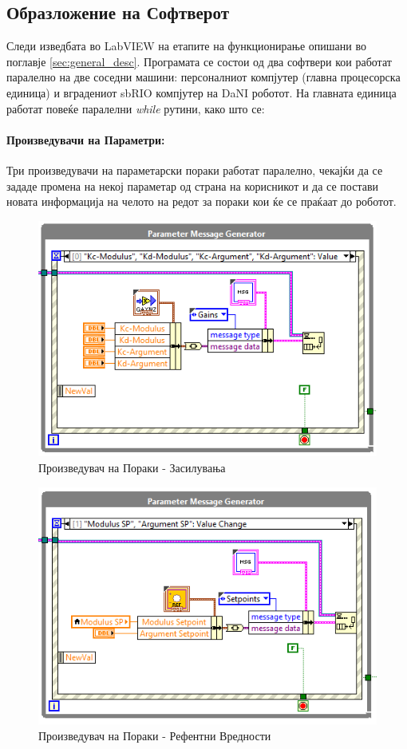 \documentclass[12pt]{article}
\begin{document}
  \subsection{Образложение на Софтверот}
    Следи изведбата во LabVIEW на етапите на функционирање опишани во поглавје \ref{sec:general_desc}. Програмата се состои од два софтвери кои работат паралелно на две соседни машини: персоналниот компјутер (главна процесорска единица) и вградениот sbRIO компјутер на DaNI роботот. На главната единица работат повеќе паралелни \textit{while} рутини, како што се:

    \paragraph{Произведувачи на Параметри:\\}
      Три произведувачи на параметарски пораки работат паралелно, чекајќи да се зададе промена на некој параметар од страна на корисникот и да се постави новата информација на челото на редот за пораки кои ќе се праќаат до роботот.
      \begin{figure}[H]
          \centering
          \includegraphics[width=0.75\linewidth]{./images/gain_message_generator.png}
          \caption{Произведувач на Пораки - Засилувања}
          \end{figure}
      \begin{figure}[H]
          \centering
          \includegraphics[width=0.75\linewidth]{./images/setpoint_message_generator.png}
          \caption{Произведувач на Пораки - Рефентни Вредности}
          \end{figure}
\end{document}

